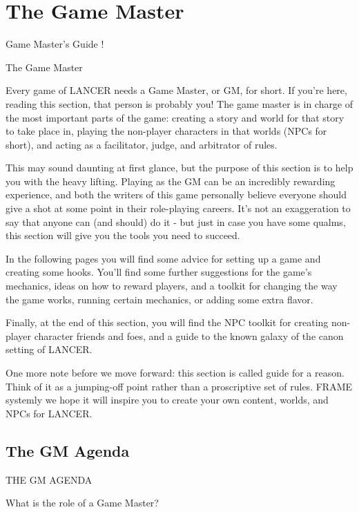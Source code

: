 \section{The Game Master}
Game Master’s Guide 
!                                                                                                         
 

The Game Master  

Every game of LANCER needs a Game Master, or GM, for short. If you’re here, reading this  
section, that person is probably you! The game master is in charge of the most important parts of  
the game: creating a story and world for that story to take place in, playing the non-player  
characters in that worlds (NPCs for short), and acting as a facilitator, judge, and arbitrator of  
rules.
 

This may sound daunting at first glance, but the purpose of this section is to help you with the  
heavy lifting. Playing as the GM can be an incredibly rewarding experience, and both the writers  
of this game personally believe everyone should give a shot at some point in their role-playing  
careers. It’s not an exaggeration to say that anyone can (and should) do it - but just in case you  
have some qualms, this section will give you the tools you need to succeed.
 

In the following pages you will find some advice for setting up a game and creating some  
hooks. You’ll find some further suggestions for the game’s mechanics, ideas on how to reward  
players, and a toolkit for changing the way the game works, running certain mechanics, or  
adding some extra flavor.
 

Finally, at the end of this section, you will find the NPC toolkit for creating non-player character  
friends and foes, and a guide to the known galaxy of the canon setting of LANCER.
 

One more note before we move forward: this section is called guide for a reason. Think of it as a  
jumping-off point rather than a proscriptive set of rules. FRAME systemly we hope it will inspire  
you to create your own content, worlds, and NPCs for LANCER.  

\subsection{The GM Agenda}
                                         THE GM AGENDA  

What is the role of a Game Master?
 

